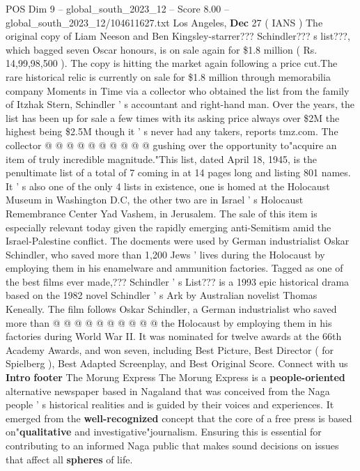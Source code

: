 \begin{textsample}{POS Dim 9 – global\_south\_2023\_12 – Score 8.00 – global\_south\_2023\_12/104611627.txt}
Los Angeles, \textbf{Dec} 27 ( IANS ) The original copy of Liam Neeson and Ben Kingsley-starrer???
Schindler??? s list???, which bagged seven Oscar honours, is on sale again for \$1.8 million ( Rs. 14,99,98,500 ).
The copy is hitting the market again following a price cut.The rare historical relic is currently on sale for \$1.8 million through memorabilia company Moments in Time via a collector who obtained the list from the family of Itzhak Stern, Schindler ' s accountant and right-hand man.
Over the years, the list has been up for sale a few times with its asking price always over \$2M the highest being \$2.5M though it ' s never had any takers, reports tmz.com.
The collector @ @ @ @ @ @ @ @ @ @ gushing over the opportunity to"acquire an item of truly incredible magnitude."This list, dated April 18, 1945, is the penultimate list of a total of 7 coming in at 14 pages long and listing 801 names.
It ' s also one of the only 4 lists in existence, one is homed at the Holocaust Museum in Washington D.C, the other two are in Israel ' s Holocaust Remembrance Center Yad Vashem, in Jerusalem.
The sale of this item is especially relevant today given the rapidly emerging anti-Semitism amid the Israel-Palestine conflict.
The docments were used by German industrialist Oskar Schindler, who saved more than 1,200 Jews ' lives during the Holocaust by employing them in his enamelware and ammunition factories.
Tagged as one of the best films ever made,???
Schindler ' s List??? is a 1993 epic historical drama based on the 1982 novel Schindler ' s Ark by Australian novelist Thomas Keneally.
The film follows Oskar Schindler, a German industrialist who saved more than @ @ @ @ @ @ @ @ @ @ the Holocaust by employing them in his factories during World War II.
It was nominated for twelve awards at the 66th Academy Awards, and won seven, including Best Picture, Best Director ( for Spielberg ), Best Adapted Screenplay, and Best Original Score.
Connect with us \textbf{Intro} \textbf{footer} The Morung Express The Morung Express is a \textbf{people-oriented} alternative newspaper based in Nagaland that was conceived from the Naga people ' s historical realities and is guided by their voices and experiences.
It emerged from the \textbf{well-recognized} concept that the core of a free press is based on"\textbf{qualitative} and investigative"journalism.
Ensuring this is essential for contributing to an informed Naga public that makes sound decisions on issues that affect all \textbf{spheres} of life.

\end{textsample}
